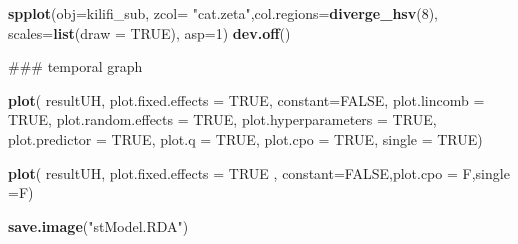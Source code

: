 \documentclass[]{article}
\newenvironment{Shaded}{\begin{snugshade}}{\end{snugshade}}
\newcommand{\KeywordTok}[1]{\textcolor[rgb]{0.13,0.29,0.53}{\textbf{#1}}}
\newcommand{\DataTypeTok}[1]{\textcolor[rgb]{0.13,0.29,0.53}{#1}}
\newcommand{\DecValTok}[1]{\textcolor[rgb]{0.00,0.00,0.81}{#1}}
\newcommand{\StringTok}[1]{\textcolor[rgb]{0.31,0.60,0.02}{#1}}
\newcommand{\OtherTok}[1]{\textcolor[rgb]{0.56,0.35,0.01}{#1}}
\newcommand{\NormalTok}[1]{#1}
\begin{document}
\begin{Shaded}
\begin{Highlighting}[]
{{\KeywordTok{spplot}\NormalTok{(}\DataTypeTok{obj=}\NormalTok{kilifi_sub, }\DataTypeTok{zcol=} \StringTok{"cat.zeta"}\NormalTok{,}\DataTypeTok{col.regions=}\KeywordTok{diverge_hsv}\NormalTok{(}\DecValTok{8}\NormalTok{), }\DataTypeTok{scales=}\KeywordTok{list}\NormalTok{(}\DataTypeTok{draw =} \OtherTok{TRUE}\NormalTok{), }\DataTypeTok{asp=}\DecValTok{1}\NormalTok{)}
\KeywordTok{dev.off}\NormalTok{()}

\NormalTok{### temporal graph}

\KeywordTok{plot}\NormalTok{( resultUH, }\DataTypeTok{plot.fixed.effects =} \OtherTok{TRUE}\NormalTok{, }\DataTypeTok{constant=}\OtherTok{FALSE}\NormalTok{,}
      \DataTypeTok{plot.lincomb =} \OtherTok{TRUE}\NormalTok{, }
      \DataTypeTok{plot.random.effects =} \OtherTok{TRUE}\NormalTok{, }
      \DataTypeTok{plot.hyperparameters =} \OtherTok{TRUE}\NormalTok{,}
      \DataTypeTok{plot.predictor =} \OtherTok{TRUE}\NormalTok{, }
      \DataTypeTok{plot.q =} \OtherTok{TRUE}\NormalTok{, }
      \DataTypeTok{plot.cpo =} \OtherTok{TRUE}\NormalTok{,}
      \DataTypeTok{single =} \OtherTok{TRUE}\NormalTok{)}

  \KeywordTok{plot}\NormalTok{( resultUH, }\DataTypeTok{plot.fixed.effects =} \OtherTok{TRUE}\NormalTok{ , }\DataTypeTok{constant=}\OtherTok{FALSE}\NormalTok{,}\DataTypeTok{plot.cpo =}\NormalTok{ F,}\DataTypeTok{single =}\NormalTok{F)}
  
\KeywordTok{save.image}\NormalTok{(}\StringTok{"stModel.RDA"}\NormalTok{)  }

}}
\end{Highlighting}
\end{Shaded}
\end{document}
